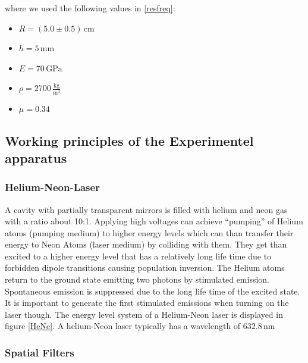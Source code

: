 where we used the following values in \ref{resfreq}:

\begin{itemize}
	\item $ R = (5.0\pm0.5)\,\mathrm{cm}$
	\item $h=5\,\mathrm{mm}$
	\item $E=70\,\mathrm{GPa}$
	\item $\rho = 2700\,\frac{\mathrm{kg}}{\mathrm{m^3}}$
	\item $\mu = 0.34$ 
\end{itemize}



\subsection{Working principles of the Experimentel apparatus}

\subsubsection{Helium-Neon-Laser \label{HeNe1}}

A cavity with partially transparent mirrors is filled with helium and neon gas with a ratio about 10:1. Applying high voltages can achieve ``pumping'' of Helium atoms (pumping medium) to higher energy levels which can than transfer their energy to Neon Atoms (laser medium) by colliding with them. They get than excited to a higher energy level that has a relatively long life time due to forbidden dipole transitions causing population inversion.
The Helium atoms return to the ground state emitting two photons by stimulated emission. Spontaneous emission is suppressed due to the long life time of the excited state. It is important to generate the first stimulated emissions when turning on the laser though.
The energy level system of a Helium-Neon laser is displayed in figure \ref{HeNe}. A helium-Neon laser typically has a wavelength of $632.8\,\mathrm{nm}$



\subsubsection{Spatial Filters \label{SF}}

